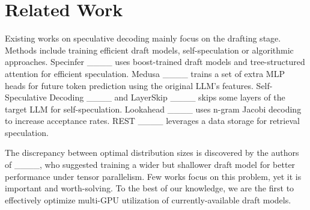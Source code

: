 \section{Related Work}
\label{related_work}

Existing works on speculative decoding mainly focus on the drafting stage. Methods include training efficient draft models, self-speculation or algorithmic approaches. Specinfer ____ uses boost-trained draft models and tree-structured attention for efficient speculation. Medusa ____ trains a set of extra MLP heads for future token prediction using the original LLM’s features. Self-Speculative Decoding ____ and LayerSkip ____ skips some layers of the target LLM for self-speculation. Lookahead ____ uses n-gram Jacobi decoding to increase acceptance rates. REST ____ leverages a data storage for retrieval speculation.

The discrepancy between optimal distribution sizes is discovered by the authors of ____, who suggested training a wider but shallower draft model for better performance under tensor parallelism. Few works focus on this problem, yet it is important and worth-solving. To the best of our knowledge, we are the first to effectively optimize multi-GPU utilization of currently-available draft models.